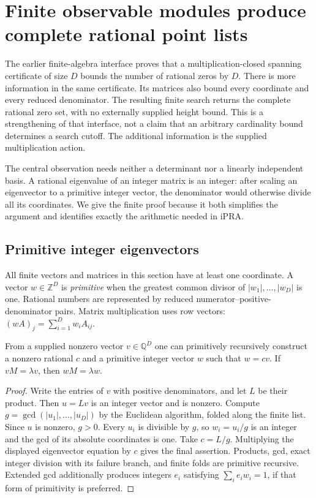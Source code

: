 \section{Finite observable modules produce complete rational point lists}
\label{sec:finite-observable-modules}

The earlier finite-algebra interface proves that a multiplication-closed
spanning certificate of size $D$ bounds the number of rational zeros by
$D$.  There is more information in the same certificate.  Its matrices
also bound every coordinate and every reduced denominator.  The resulting
finite search returns the complete rational zero set, with no externally
supplied height bound.  This is a strengthening of that interface, not a
claim that an arbitrary cardinality bound determines a search cutoff.
The additional information is the supplied multiplication action.

The central observation needs neither a determinant nor a linearly
independent basis.  A rational eigenvalue of an integer matrix is an
integer: after scaling an eigenvector to a primitive integer vector,
the denominator would otherwise divide all its coordinates.  We give
the finite proof because it both simplifies the argument and identifies
exactly the arithmetic needed in iPRA.

\subsection{Primitive integer eigenvectors}

All finite vectors and matrices in this section have at least one
coordinate.  A vector $w\in\mathbb Z^D$ is \emph{primitive} when the
greatest common divisor of $|w_1|,\ldots,|w_D|$ is one.  Rational
numbers are represented by reduced numerator--positive-denominator
pairs.  Matrix multiplication uses row vectors: $(wA)_j=
\sum_{i=1}^D w_i A_{ij}$.

\begin{lemma}
\label{lem:primitive-scaling}
From a supplied nonzero vector $v\in\mathbb Q^D$ one can primitively
recursively construct a nonzero rational $c$ and a primitive integer
vector $w$ such that $w=cv$.  If $vM=\lambda v$, then
$wM=\lambda w$.
\end{lemma}

\begin{proof}
Write the entries of $v$ with positive denominators, and let $L$ be
their product.  Then $u=Lv$ is an integer vector and is nonzero.
Compute $g=\gcd(|u_1|,\ldots,|u_D|)$ by the Euclidean algorithm,
folded along the finite list.  Since $u$ is nonzero, $g>0$.
Every $u_i$ is divisible by $g$, so $w_i=u_i/g$ is an integer and
the gcd of its absolute coordinates is one.  Take $c=L/g$.
Multiplying the displayed eigenvector equation by $c$ gives the final
assertion.  Products, gcd, exact integer division with its failure
branch, and finite folds are primitive recursive.  Extended gcd
additionally produces integers $e_i$ satisfying
$\sum_i e_iw_i=1$, if that form of primitivity is preferred.
\end{proof}

